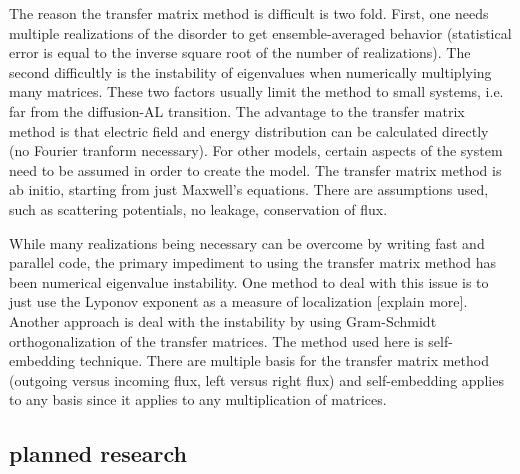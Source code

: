 The reason the transfer matrix method is difficult is two fold. First, one needs multiple realizations of the disorder to get ensemble-averaged behavior (statistical error is equal to the inverse square root of the number of realizations). The second difficultly is the instability of eigenvalues when numerically multiplying many matrices. These two factors usually limit the method to small systems, i.e. far from the diffusion-AL transition. The advantage to the transfer matrix method is that electric field and energy distribution can be calculated directly (no Fourier tranform necessary). For other models, certain aspects of the system need to be assumed in order to create the model. The transfer matrix method is ab initio, starting from just Maxwell's equations\cite{1999_Jackson}. There are assumptions used, such as scattering potentials, no leakage, conservation of flux.

While many realizations being necessary can be overcome by writing fast and parallel code, the primary impediment to using the transfer matrix method has been numerical eigenvalue instability. One method to deal with this issue is to just use the Lyponov exponent as a measure of localization [explain more]. Another approach is deal with the instability by using Gram-Schmidt orthogonalization of the transfer matrices. The method used here is self-embedding  technique\cite{2001_Yamilov}\cite{1999_yamilov_selfembed}\cite{1976_Bellman_Wing_embedding}. There are multiple basis for the transfer matrix method (outgoing versus incoming flux, left versus right flux) and self-embedding applies to any basis since it applies to any multiplication of matrices.

\subsection{planned research}

